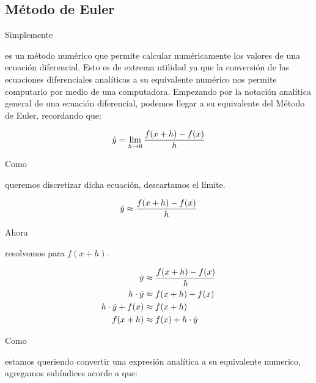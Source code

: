 \documentclass[stu, 12pt, letterpaper, donotrepeattitle, floatsintext]{apa7}
\begin{document}
    \subsection*{Método de Euler}
    Simplemente \begin{justifying}
      es un método numérico que permite calcular numéricamente los valores de una ecuación diferencial. Esto es de extrema utilidad ya que la conversión de las ecuaciones diferenciales
    analíticas a su equivalente numérico nos permite computarlo por medio de una computadora. Empezando por la notación analítica general de una ecuación diferencial, podemos llegar a su equivalente
    del Método de Euler, recordando que:\par
    \end{justifying}
    \vspace*{-\abovedisplayskip}
    \[\dot{y}=\lim_{h\rightarrow 0}{f(x+h)-f(x) \over h}\]\par
    Como \begin{justifying}
      queremos discretizar dicha ecuación, descartamos el límite.\par
    \end{justifying}
    \vspace*{-\abovedisplayskip}
    \[\dot{y}\approx{f(x+h)-f(x) \over h}\]\par
    Ahora \begin{justifying}
      resolvemos para \(f(x+h)\).\par
    \end{justifying}
    \vspace*{-\abovedisplayskip}
    \begin{equation*}
      \begin{aligned}
        \dot{y}&\approx{f(x+h)-f(x) \over h}\\
        h\cdot\dot{y}&\approx f(x+h)-f(x)\\
        h\cdot\dot{y}+f(x)&\approx f(x+h)\\
        f(x+h)&\approx f(x)+h\cdot\dot{y}
      \end{aligned}
    \end{equation*}\par
    Como \begin{justifying}
      estamos queriendo convertir una expresión analítica a su equivalente numerico, agregamos subíndices acorde a que: \par
    \end{justifying}
    \vspace*{-\abovedisplayskip}
\end{document}
